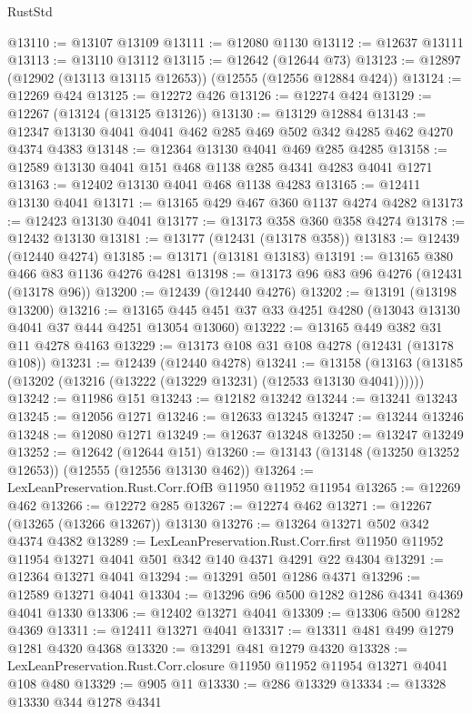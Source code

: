 \begin{lexlean}{RustStd}
\begin{coremodule}
@13110 := @13107 @13109
@13111 := @12080 @1130
@13112 := @12637 @13111
@13113 := @13110 @13112
@13115 := @12642 (@12644 @73)
@13123 := @12897 (@12902 (@13113 @13115 @12653)) (@12555 (@12556 @12884 @424))
@13124 := @12269 @424
@13125 := @12272 @426
@13126 := @12274 @424
@13129 := @12267 (@13124 (@13125 @13126))
@13130 := @13129 @12884
@13143 := @12347 @13130 @4041 @4041 @462 @285 @469 @502 @342 @4285 @462 @4270 @4374 @4383
@13148 := @12364 @13130 @4041 @469 @285 @4285
@13158 := @12589 @13130 @4041 @151 @468 @1138 @285 @4341 @4283 @4041 @1271
@13163 := @12402 @13130 @4041 @468 @1138 @4283
@13165 := @12411 @13130 @4041
@13171 := @13165 @429 @467 @360 @1137 @4274 @4282
@13173 := @12423 @13130 @4041
@13177 := @13173 @358 @360 @358 @4274
@13178 := @12432 @13130
@13181 := @13177 (@12431 (@13178 @358))
@13183 := @12439 (@12440 @4274)
@13185 := @13171 (@13181 @13183)
@13191 := @13165 @380 @466 @83 @1136 @4276 @4281
@13198 := @13173 @96 @83 @96 @4276 (@12431 (@13178 @96))
@13200 := @12439 (@12440 @4276)
@13202 := @13191 (@13198 @13200)
@13216 := @13165 @445 @451 @37 @33 @4251 @4280 (@13043 @13130 @4041 @37 @444 @4251 @13054 @13060)
@13222 := @13165 @449 @382 @31 @11 @4278 @4163
@13229 := @13173 @108 @31 @108 @4278 (@12431 (@13178 @108))
@13231 := @12439 (@12440 @4278)
@13241 := @13158 (@13163 (@13185 (@13202 (@13216 (@13222 (@13229 @13231) (@12533 @13130 @4041))))))
@13242 := @11986 @151
@13243 := @12182 @13242
@13244 := @13241 @13243
@13245 := @12056 @1271
@13246 := @12633 @13245
@13247 := @13244 @13246
@13248 := @12080 @1271
@13249 := @12637 @13248
@13250 := @13247 @13249
@13252 := @12642 (@12644 @151)
@13260 := @13143 (@13148 (@13250 @13252 @12653)) (@12555 (@12556 @13130 @462))
@13264 := LexLeanPreservation.Rust.Corr.fOfB @11950 @11952 @11954
@13265 := @12269 @462
@13266 := @12272 @285
@13267 := @12274 @462
@13271 := @12267 (@13265 (@13266 @13267)) @13130
@13276 := @13264 @13271 @502 @342 @4374 @4382
@13289 := LexLeanPreservation.Rust.Corr.first
    @11950
    @11952
    @11954
    @13271
    @4041
    @501
    @342
    @140
    @4371
    @4291
    @22
    @4304
@13291 := @12364 @13271 @4041
@13294 := @13291 @501 @1286 @4371
@13296 := @12589 @13271 @4041
@13304 := @13296 @96 @500 @1282 @1286 @4341 @4369 @4041 @1330
@13306 := @12402 @13271 @4041
@13309 := @13306 @500 @1282 @4369
@13311 := @12411 @13271 @4041
@13317 := @13311 @481 @499 @1279 @1281 @4320 @4368
@13320 := @13291 @481 @1279 @4320
@13328 := LexLeanPreservation.Rust.Corr.closure @11950 @11952 @11954 @13271 @4041 @108 @480
@13329 := @905 @11
@13330 := @286 @13329
@13334 := @13328 @13330 @344 @1278 @4341

\end{coremodule}
\end{lexlean}
